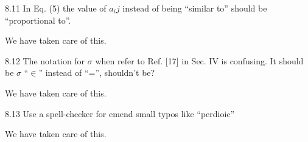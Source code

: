 \documentclass[english]{letter}
\begin{document}
\begin{shaded}
8.11 In Eq. (5) the value of $a_ij$ instead of being “similar to” should
be “proportional to”.
\end{shaded}
\noindent We have taken care of this.

\begin{shaded}
8.12 The notation for $\sigma$ when refer to Ref. [17] in Sec. IV is
confusing. It should be $\sigma$ “$\in$” instead of “=”, shouldn't be?
\end{shaded}
\noindent We have taken care of this. 

\begin{shaded}
8.13 Use a spell-checker for emend small typos like “perdioic”
\end{shaded}
\noindent We have taken care of this.
\end{document}
